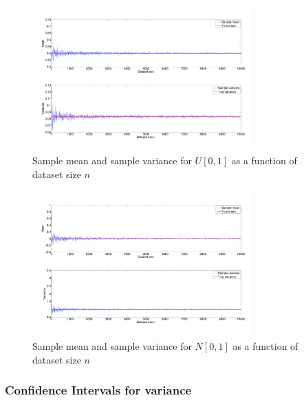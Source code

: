 \documentclass[10pt]{article}
\begin{document}
\begin{figure}[h!]
  \centering
  \includegraphics[width=0.75\textwidth, trim = 0 100 0 0]{images/hw1_4_a_uni.pdf}
  \caption{Sample mean and sample variance for $U[0,1]$ as a function of dataset size $n$}
  \label{fig:uni_n}
\end{figure}

\begin{figure}[h!]
  \centering
  \includegraphics[width=0.75\textwidth, trim = 0 100 0 0]{images/hw1_4_a_norm.pdf}
  \caption{Sample mean and sample variance for $N[0,1]$ as a function of dataset size $n$}
  \label{fig:norm_n}
\end{figure}

\subsubsection*{Confidence Intervals for variance}
\end{document}
